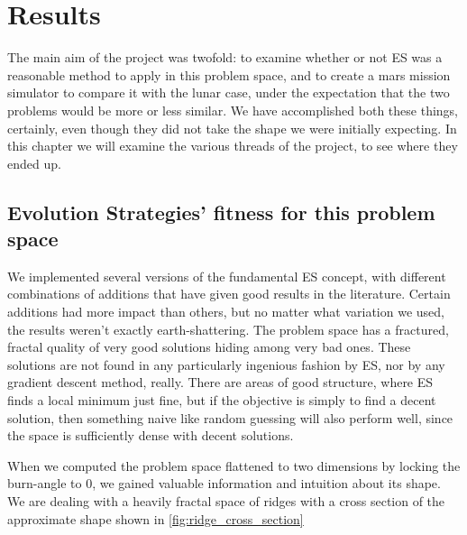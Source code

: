 
\chapter{Results}
The main aim of the project was twofold: to examine whether or not ES was a reasonable method to apply in this problem space, and to create a mars mission simulator to compare it with the lunar case, under the expectation that the two problems would be more or less similar. We have accomplished both these things, certainly, even though they did not take the shape we were initially expecting. In this chapter we will examine the various threads of the project, to see where they ended up.

\section{Evolution Strategies' fitness for this problem space}
We implemented several versions of the fundamental ES concept, with different combinations of additions that have given good results in the literature. Certain additions had more impact than others, but no matter what variation we used, the results weren't exactly earth-shattering. The problem space has a fractured, fractal quality of very good solutions hiding among very bad ones. These solutions are not found in any particularly ingenious fashion by ES, nor by any gradient descent method, really. There are areas of good structure, where ES finds a local minimum just fine, but if the objective is simply to find a decent solution, then something naive like random guessing will also perform well, since the space is sufficiently dense with decent solutions. 

When we computed the problem space flattened to two dimensions by locking the burn-angle to 0, we gained valuable information and intuition about its shape. We are dealing with a heavily fractal space of ridges with a cross section of the approximate shape shown in \cref{fig:ridge_cross_section}

